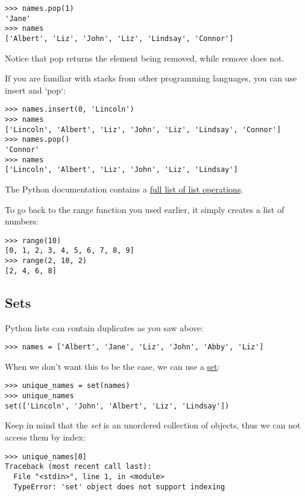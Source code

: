 \begin{verbatim}
>>> names.pop(1)
'Jane'
>>> names
['Albert', 'Liz', 'John', 'Liz', 'Lindsay', 'Connor']
\end{verbatim}

Notice that pop returns the element being removed, while remove does
not.

If you are familiar with stacks from other programming languages, you
can use insert and `pop`:

\begin{verbatim}
>>> names.insert(0, 'Lincoln')
>>> names
['Lincoln', 'Albert', 'Liz', 'John', 'Liz', 'Lindsay', 'Connor']
>>> names.pop()
'Connor'
>>> names
['Lincoln', 'Albert', 'Liz', 'John', 'Liz', 'Lindsay']
\end{verbatim}

The Python documentation contains a \href{}{full list of list
operations}.

To go back to the range function you used earlier, it simply creates a
list of numbers:

\begin{verbatim}
>>> range(10)
[0, 1, 2, 3, 4, 5, 6, 7, 8, 9]
>>> range(2, 10, 2)
[2, 4, 6, 8]
\end{verbatim}

\subsection{Sets}\label{sets}

Python lists can contain duplicates as you saw above:

\begin{verbatim}
>>> names = ['Albert', 'Jane', 'Liz', 'John', 'Abby', 'Liz']
\end{verbatim}

When we don't want this to be the case, we can use a
\href{https://docs.python.org/2/library/stdtypes.html\#set}{set}:

\begin{verbatim}
>>> unique_names = set(names)
>>> unique_names
set(['Lincoln', 'John', 'Albert', 'Liz', 'Lindsay'])
\end{verbatim}

Keep in mind that the \emph{set} is an unordered collection of objects,
thus we can not access them by index:

\begin{verbatim}
>>> unique_names[0]
Traceback (most recent call last):
  File "<stdin>", line 1, in <module>
  TypeError: 'set' object does not support indexing
\end{verbatim}

